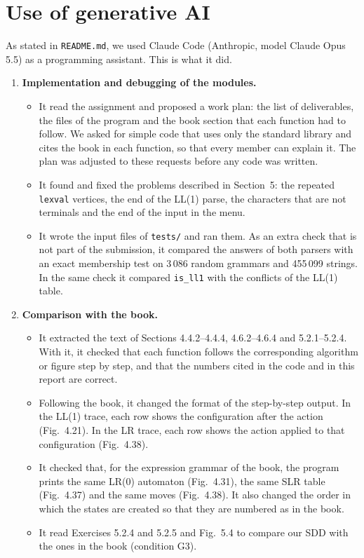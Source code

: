 \documentclass[11pt,a4paper]{article}
\newcommand{\code}[1]{\texttt{#1}}
\begin{document}
\section{Use of generative AI}

As stated in \code{README.md}, we used Claude Code (Anthropic, model Claude Opus 5.5) as a programming
assistant. This is what it did.

\begin{enumerate}
  \item \textbf{Implementation and debugging of the modules.}
  \begin{itemize}
    \item It read the assignment and proposed a work plan: the list of deliverables, the files of the program and the book section that each function had to follow. We asked for simple code that uses only the standard library and cites the book in each function, so that every member can explain it. The plan was adjusted to these requests before any code was written.
    \item It found and fixed the problems described in Section~5: the repeated \code{lexval} vertices, the end of the LL(1) parse, the characters that are not terminals and the end of the input in the menu.
    \item It wrote the input files of \code{tests/} and ran them. As an extra check that is not part of the submission, it compared the answers of both parsers with an exact membership test on 3\,086 random grammars and 455\,099 strings. In the same check it compared \code{is\_ll1} with the conflicts of the LL(1) table.
  \end{itemize}

  \item \textbf{Comparison with the book.}
  \begin{itemize}
    \item It extracted the text of Sections 4.4.2--4.4.4, 4.6.2--4.6.4 and 5.2.1--5.2.4. With it, it checked that each function follows the corresponding algorithm or figure step by step, and that the numbers cited in the code and in this report are correct.
    \item Following the book, it changed the format of the step-by-step output. In the LL(1) trace, each row shows the configuration after the action (Fig.~4.21). In the LR trace, each row shows the action applied to that configuration (Fig.~4.38).
    \item It checked that, for the expression grammar of the book, the program prints the same LR(0) automaton (Fig.~4.31), the same SLR table (Fig.~4.37) and the same moves (Fig.~4.38). It also changed the order in which the states are created so that they are numbered as in the book.
    \item It read Exercises 5.2.4 and 5.2.5 and Fig.~5.4 to compare our SDD with the ones in the book (condition G3).
  \end{itemize}
\end{enumerate}
\end{document}
